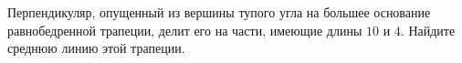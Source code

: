\begin{ex}
	\begin{condition}
		Перпендикуляр, опущенный из вершины тупого угла на большее основание равнобедренной трапеции, делит его на части, имеющие длины \( 10  \) и \( 4 \). Найдите среднюю линию этой трапеции.
	\end{condition}
\end{ex}